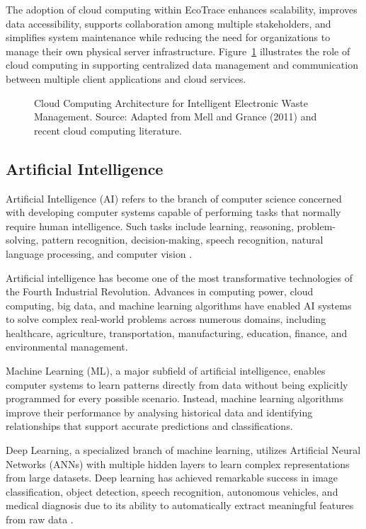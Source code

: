 The adoption of cloud computing within EcoTrace enhances scalability, improves
data accessibility, supports collaboration among multiple stakeholders, and
simplifies system maintenance while reducing the need for organizations to
manage their own physical server infrastructure. Figure~\ref{fig:cloud-arch}
illustrates the role of cloud computing in supporting centralized data management
and communication between multiple client applications and cloud services.

\begin{figure}[H]
  \centering
  \caption{Cloud Computing Architecture for Intelligent Electronic Waste Management. Source: Adapted from Mell and Grance (2011) and recent cloud computing literature.}
  \label{fig:cloud-arch}
\end{figure}

\subsection{Artificial Intelligence}

Artificial Intelligence (AI) refers to the branch of computer science concerned with
developing computer systems capable of performing tasks that normally require
human intelligence. Such tasks include learning, reasoning, problem-solving,
pattern recognition, decision-making, speech recognition, natural language
processing, and computer vision \citep{russell2021}.

Artificial intelligence has become one of the most transformative technologies
of the Fourth Industrial Revolution. Advances in computing power, cloud
computing, big data, and machine learning algorithms have enabled AI systems to
solve complex real-world problems across numerous domains, including
healthcare, agriculture, transportation, manufacturing, education, finance, and
environmental management.

Machine Learning (ML), a major subfield of artificial intelligence, enables
computer systems to learn patterns directly from data without being explicitly
programmed for every possible scenario. Instead, machine learning algorithms
improve their performance by analysing historical data and identifying
relationships that support accurate predictions and classifications.

Deep Learning, a specialized branch of machine learning, utilizes Artificial
Neural Networks (ANNs) with multiple hidden layers to learn complex
representations from large datasets. Deep learning has achieved remarkable
success in image classification, object detection, speech recognition, autonomous
vehicles, and medical diagnosis due to its ability to automatically extract
meaningful features from raw data \citep{goodfellow2016}.

